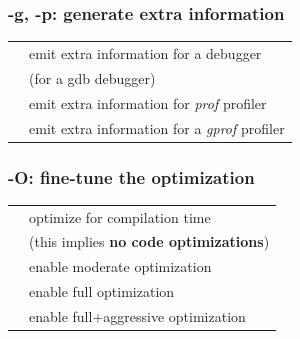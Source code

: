 \documentclass{beamer}
\begin{document}
\begin{frame}
\frametitle{-g, -p: generate extra information}
\begin{table}
\begin{tabular}{l l}
\toprule
\texttt{\color{clFlag}{-g}} & emit extra information for a debugger\\ [3ex]
\texttt{\color{clFlag}{-ggdb}} & (for a gdb debugger)\\ [3ex]
\texttt{\color{clFlag}{-p}} & emit extra information for \textit{prof} profiler\\ [3ex]
\texttt{\color{clFlag}{-pg}} & emit extra information for a \textit{gprof} profiler\\ [3ex]
\bottomrule
\end{tabular}
\end{table}
\end{frame}


\begin{frame}
\frametitle{-O: fine-tune the optimization}
\begin{table}
\begin{tabular}{l l}
\toprule
\texttt{\color{clFlag}{-O0}} &
    optimize for compilation time \\[1ex]
    & (this implies \textbf{no code optimizations})\\ [2ex]
\texttt{\color{clFlag}{-O1}} & enable moderate optimization \\ [3ex]
\texttt{\color{clFlag}{-O2}} & enable full optimization\\ [3ex]
\texttt{\color{clFlag}{-O3}} & enable full+aggressive optimization\\ [3ex]
\bottomrule
\end{tabular}
\end{table}
\end{frame}
\end{document}
